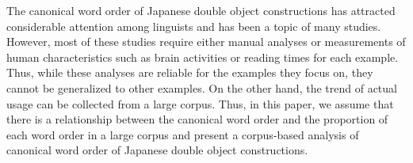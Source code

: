 The canonical word order of Japanese double object constructions has attracted considerable attention among linguists and has been a topic of many studies. However, most of these studies require either manual analyses or measurements of human characteristics such as brain activities or reading times for each example. Thus, while these analyses are reliable for the examples they focus on, they cannot be generalized to other examples. On the other hand, the trend of actual usage can be collected from a large corpus. Thus, in this paper, we assume that there is a relationship between the canonical word order and the proportion of each word order in a large corpus and present a corpus-based analysis of canonical word order of Japanese double object constructions.
